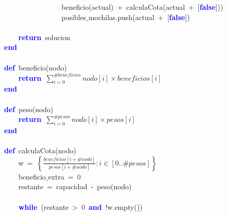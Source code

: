 \mbox{}\ \ \ \ \ \ \ \ \ \ \ \ \ \ \ \ \ \ \ \ beneficio\textcolor{BrickRed}{(}actual\textcolor{BrickRed}{)}\ \textcolor{BrickRed}{+}\ calculaCota\textcolor{BrickRed}{(}actual\ \textcolor{BrickRed}{+}\ \textcolor{BrickRed}{[}\textbf{\textcolor{Blue}{false}}\textcolor{BrickRed}{]))} \\
\mbox{}\ \ \ \ \ \ \ \ \ \ \ \ \ \ \ \ \ \ \ \ posibles$\_$mochilas\textcolor{BrickRed}{.}push\textcolor{BrickRed}{(}actual\ \textcolor{BrickRed}{+}\ \textcolor{BrickRed}{[}\textbf{\textcolor{Blue}{false}}\textcolor{BrickRed}{])} \\
\mbox{} \\
\mbox{}\ \ \ \ \ \ \ \ \textbf{\textcolor{Blue}{return}}\ solucion \\
\mbox{}\ \ \ \ \textbf{\textcolor{Blue}{end}} \\
\mbox{} \\
\mbox{}\ \ \ \ \textbf{\textcolor{Blue}{def}}\ beneficio\textcolor{BrickRed}{(}nodo\textcolor{BrickRed}{)} \\
\mbox{}\ \ \ \ \ \ \ \ \textbf{\textcolor{Blue}{return}}\ $\sum_{i=0}^{\#beneficios} nodo[i]\times beneficios[i]$ \\
\mbox{}\ \ \ \ \textbf{\textcolor{Blue}{end}} \\
\mbox{} \\
\mbox{}\ \ \ \ \textbf{\textcolor{Blue}{def}}\ peso\textcolor{BrickRed}{(}nodo\textcolor{BrickRed}{)} \\
\mbox{}\ \ \ \ \ \ \ \ \textbf{\textcolor{Blue}{return}}\ $\sum_{i=0}^{\#pesos} nodo[i]\times pesos[i]$ \\
\mbox{}\ \ \ \ \textbf{\textcolor{Blue}{end}} \\
\mbox{} \\
\mbox{}\ \ \ \ \textbf{\textcolor{Blue}{def}}\ calculaCota\textcolor{BrickRed}{(}nodo\textcolor{BrickRed}{)} \\
\mbox{}\ \ \ \ \ \ \ \ w\ \textcolor{BrickRed}{=}\ $ \left\{\frac{beneficios[i+\#nodo]}{pesos[i+\#nodo]} : i \in [0..\#pesos]\right\} $ \\
\mbox{}\ \ \ \ \ \ \ \ beneficio$\_$extra\ \textcolor{BrickRed}{=}\ \textcolor{Purple}{0} \\
\mbox{}\ \ \ \ \ \ \ \ restante\ \textcolor{BrickRed}{=}\ capacidad\ \textcolor{BrickRed}{-}\ peso\textcolor{BrickRed}{(}nodo\textcolor{BrickRed}{)} \\
\mbox{} \\
\mbox{}\ \ \ \ \ \ \ \ \textbf{\textcolor{Blue}{while}}\ \textcolor{BrickRed}{(}restante\ \textcolor{BrickRed}{\textgreater{}}\ \textcolor{Purple}{0}\ \textbf{\textcolor{Blue}{and}}\ \textcolor{BrickRed}{!}w\textcolor{BrickRed}{.}empty\textcolor{BrickRed}{())} \\
